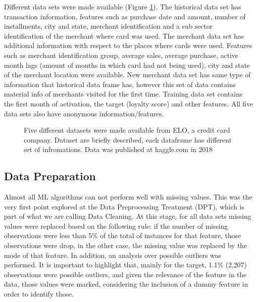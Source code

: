 \documentclass[letterpaper, 10 pt, conference]{ieeeconf}  %
\begin{document}
Different data sets were made available (Figure \ref{Fig_data}). The historical data set has transaction information, features such as purchase date and amount, number of installments, city and state, merchant identification and a sub sector identification of the merchant where card was used. The merchant data set has additional information with respect to the places where cards were used. Features such as merchant identification group, average sales, average purchase, active month lags (amount of months in which card had not being used), city and state of the merchant location were available. New merchant data set has same type of information that historical data frame has, however this set of data contains material info of merchants visited for the first time. Training data set contains the first month of activation, the target (loyalty score) and other features. All five data sets also have anonymous information/features.\\

\begin{figure}[thpb]
\centering
{}
\caption{Five different datasets were made available from ELO, a credit card company. Dataset are briefly described, each dataframe has different set of infromations. Data was published at kaggle.com in 2018 \cite{Kaggle}}
\label{Fig_data}
\end{figure}


\subsection{Data Preparation}
Almost all ML algorithms can not perform well with missing values. This was the very first point explored at the Data Preprocessing Treatment (DPT), which is part of what we are calling Data Cleaning. At this stage, for all data sets missing values were replaced based on the following rule: if the number of missing observations were less than 5\% of the total of instances for that feature, those observations were drop, in the other case, the missing value was replaced by the mode of that feature. In addition, an analysis over possible outliers was performed. It is important to highlight that, mainly for the target, 1.1\% (2,207) observations were possible outliers, and given the relevance of the feature in the data, those values were marked, considering the inclusion of a dummy feature in order to identify those.\\
\end{document}
